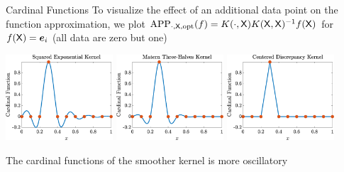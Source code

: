 \documentclass[10pt,compress,xcolor={usenames,dvipsnames},aspectratio=169]{beamer}
\DeclareMathOperator{\APP}{APP}
\begin{document}
\begin{frame}{Cardinal Functions}
	To visualize the effect of an additional data point on the function approximation, we plot $\APP_{\cdot,\mX,\opt}(f) = K(\cdot,\mX) K(\mX,\mX)^{-1} f(\mX)$ for $f(\mathsf{X}) = \boldsymbol{e}_i$ (all data are zero but one)
	
	\begin{center}
		\includegraphics[width = 0.3\textwidth]{Card-sqexpker.eps} \quad
		\includegraphics[width = 0.3\textwidth]{Card-maternkerthreehalfs.eps} \quad
		\includegraphics[width = 0.3\textwidth]{Card-ctrdiscker.eps} 
	\end{center}

The cardinal functions of the smoother kernel is more oscillatory
\end{frame}
\end{document}
